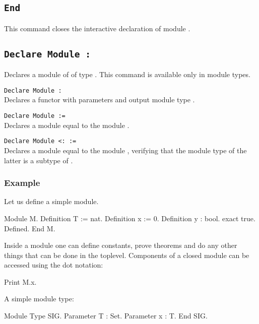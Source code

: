 \subsection{\tt End {\ident}}
This command closes the interactive declaration of module {\ident}.

\subsection{\tt Declare Module {\ident} : {\modtype}}
Declares a module of {\ident} of type {\modtype}. This command is available
only in module types. 

\begin{Variants}
\item{\tt Declare Module {\ident} {\modbindings} \verb.:. {\modtype}}\\
  Declares a functor with parameters {\modbindings} and output module
  type {\modtype}.
\item{\tt Declare Module {\ident} := {\qualid}}\\
  Declares a module equal to the module {\qualid}.
\item{\tt Declare Module {\ident} \verb.<:. {\modtype} := {\qualid}}\\
  Declares a module equal to the module {\qualid}, verifying that the
  module type of the latter is a subtype of {\modtype}.
\end{Variants}


\subsubsection{Example}

Let us define a simple module.
\begin{coq_example}
Module M.
Definition T := nat.
Definition x := 0.
Definition y : bool.
  exact true.
Defined.
End M.
\end{coq_example}

\noindent
Inside a module one can define constants, prove theorems and do any
other things that can be done in the toplevel. Components of a closed
module can be accessed using the dot notation:

\begin{coq_example}
Print M.x.
\end{coq_example}
A simple module type:
\begin{coq_example}
Module Type SIG.
Parameter T : Set.
Parameter x : T.
End SIG.
\end{coq_example}

